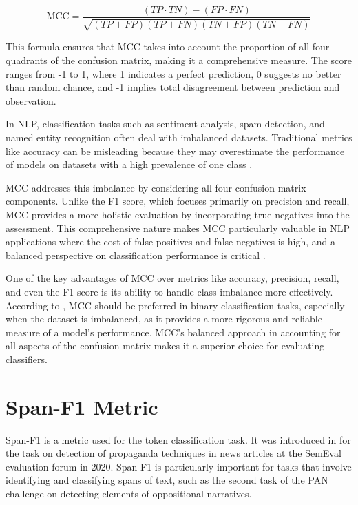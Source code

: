 \documentclass{Configuration_Files/PoliMi3i_thesis}
\begin{document}
\[
\text{MCC} = \frac{(TP \cdot TN) - (FP \cdot FN)}{\sqrt{(TP + FP)(TP + FN)(TN + FP)(TN + FN)}}
\]

This formula ensures that MCC takes into account the proportion of all four quadrants of the confusion matrix, making it a comprehensive measure. The score ranges from -1 to 1, where 1 indicates a perfect prediction, 0 suggests no better than random chance, and -1 implies total disagreement between prediction and observation.

In NLP, classification tasks such as sentiment analysis, spam detection, and named entity recognition often deal with imbalanced datasets. Traditional metrics like accuracy can be misleading because they may overestimate the performance of models on datasets with a high prevalence of one class \cite{chawla2002smote, he2009learning}.

MCC addresses this imbalance by considering all four confusion matrix components. Unlike the F1 score, which focuses primarily on precision and recall, MCC provides a more holistic evaluation by incorporating true negatives into the assessment. This comprehensive nature makes MCC particularly valuable in NLP applications where the cost of false positives and false negatives is high, and a balanced perspective on classification performance is critical \cite{chicco2020advantages, powers2020evaluation}.

One of the key advantages of MCC over metrics like accuracy, precision, recall, and even the F1 score is its ability to handle class imbalance more effectively. According to \cite{chicco2020advantages}, MCC should be preferred in binary classification tasks, especially when the dataset is imbalanced, as it provides a more rigorous and reliable measure of a model's performance. MCC's balanced approach in accounting for all aspects of the confusion matrix makes it a superior choice for evaluating classifiers.

\section{Span-F1 Metric} \label{sec:span_F1_metric}
Span-F1 is a metric used for the token classification task. It was introduced in \cite{da2020semeval} for the task on detection of propaganda techniques in news articles at the SemEval evaluation forum in 2020. Span-F1 is particularly important for tasks that involve identifying and classifying spans of text, such as the second task of the PAN challenge on detecting elements of oppositional narratives.
\end{document}

